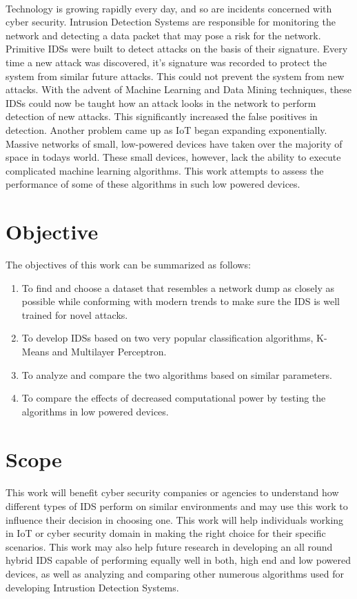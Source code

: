 \documentclass[a4paper,12pt]{article}
\begin{document}
	\paragraph{}
	Technology is growing rapidly every day, and so are incidents concerned with cyber security. Intrusion Detection Systems are responsible for monitoring the network and detecting a data packet that may pose a risk for the network. Primitive IDSs were built to detect attacks on the basis of their signature. Every time a new attack was discovered, it's signature was recorded to protect the system from similar future attacks. This could not prevent the system from new attacks. With the advent of Machine Learning and Data Mining techniques, these IDSs could now be taught how an attack looks in the network to perform detection of new attacks. This significantly increased the false positives in detection. Another problem came up as IoT began expanding exponentially. Massive networks of small, low-powered devices have taken over the majority of space in todays world. These small devices, however, lack the ability to execute complicated machine learning algorithms. This work attempts to assess the performance of some of these algorithms in such low powered devices.

	\section{Objective}
    The objectives of this work can be summarized as follows:
	\begin{enumerate}
		\item To find and choose a dataset that resembles a network dump as closely as possible while conforming with modern trends to make sure the IDS is well trained for novel attacks.
		\item To develop IDSs based on two very popular classification algorithms, K-Means and Multilayer Perceptron.
		\item To analyze and compare the two algorithms based on similar parameters.
		\item To compare the effects of decreased computational power by testing the algorithms in low powered devices.
	\end{enumerate}

	\section{Scope}
	\paragraph{}
	This work will benefit cyber security companies or agencies to understand how different types of IDS perform on similar environments and may use this work to influence their decision in choosing one. This work will help individuals working in IoT or cyber security domain in making the right choice for their specific scenarios. This work may also help future research in developing an all round hybrid IDS capable of performing equally well in both, high end and low powered devices, as well as analyzing and comparing other numerous algorithms used for developing Intrustion Detection Systems.
\end{document}
